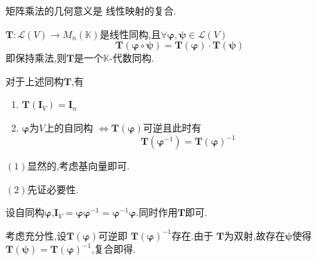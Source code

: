\begin{red}
\begin{remark}
    矩阵乘法的几何意义是
    线性映射的复合.
\end{remark}
\end{red}
\begin{green}
\begin{corollary}[代数]\label{cor:代数}
    $\bm{T}:\mathcal{L}\left(V\right)
    \longrightarrow M_n\left(\mathbb{K}
    \right)$是线性同构,且$\forall
    \bm{\varphi},\bm{\psi}\in \mathcal{L}\left(
        V
    \right)$
    \[
    \bm{T}\left(\bm{\varphi}\circ \bm{\psi}
    \right)=
    \bm{T}\left(\bm{\varphi}\right)
    \cdot \bm{T}\left(\bm{\psi}\right)
    \]
    即保持乘法,则$\bm{T}$是一个$\mathbb{K}
    $-代数同构.
\end{corollary}
\end{green}
\begin{green}
\begin{corollary}[对该代数同构的刻画]\label{cor:对该代数同构的刻画}
    对于上述同构$\bm{T}$,有
    \begin{enumerate}[label=\textup{(\arabic*)}]
        \item $\bm{T}\left(
            \bm{I}_V
        \right)=\bm{I}_n$
        \item $\bm{\varphi}$为$V$上的自同构
        $\Longleftrightarrow \bm{T}\left(
            \bm{\varphi}
        \right)$可逆且此时有
        \[
        \bm{T}\left(\bm{\varphi}^{-1}
        \right)=
        \bm{T}\left(\bm{\varphi
        }\right)^{-1}
        \]
    \end{enumerate}
\end{corollary}
\begin{Proof}
$(1)$显然的,考虑基向量即可.

$(2)$先证必要性.

设自同构$\bm{\varphi}$,$\bm{I}_V=\bm{\varphi}\bm{\varphi}^{-1}=
\bm{\varphi}^{-1}\bm{\varphi}.$同时作用$\bm{T}$即可.

考虑充分性,设$\bm{T}\left(\bm{\varphi}\right)$可逆即
$\bm{T}\left(\bm{\varphi}\right)^{-1}$存在.由于
$\bm{T}$为双射,故存在$\bm{\psi}$使得$\bm{T}\left(\bm{\psi}\right)=
\bm{T}\left(\bm{\varphi}\right)^{-1}$,复合即得.
\end{Proof}
\end{green}
